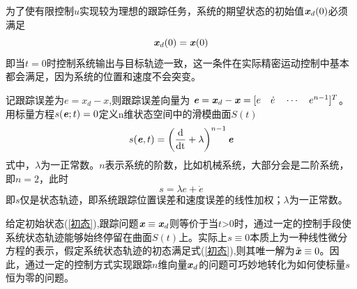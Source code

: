 为了使有限控制$u$实现较为理想的跟踪任务，系统的期望状态的初始值$\textbf{\textit{x}}_d(0)$必须满足
\begin{equation}
\label{初态}
\textbf{\textit{x}}_d(0)=\textbf{\textit{x}}(0)
\end{equation}
即当$t=0$时控制系统输出与目标轨迹一致，这一条件在实际精密运动控制中基本都会满足，因为系统的位置和速度不会突变。

记跟踪误差为$e=x_d-x$,则跟踪误差向量为 $\textbf{\textit{e}}=\textbf{\textit{x}}_d-\textbf{\textit{x}}=[e \quad\dot {e} \quad\cdots \quad e^{n-1}]^T$。用标量方程$s(\textbf{\textit{e}};t)=0$定义n维状态空间中的滑模曲面$S(t)$
\begin{equation}
\label{滑模面0}
s(\textbf{\textit{e}},t)=\left(\frac{\text{d}}{\text{dt}}+\lambda\right)^{n-1}\textbf{\textit{e}}
\end{equation}
式中，$\lambda$为一正常数。$n$表示系统的阶数，比如机械系统，大部分会是二阶系统，即$n=2$，此时
\begin{equation}
\label{滑模面1}
s=\lambda e+\dot{e}
\end{equation}
即$s$仅是状态轨迹，即系统跟踪位置误差和速度误差的线性加权；$\lambda$为一正常数。


给定初始状态(\ref{初态}),跟踪问题$\textbf{\textit{x}}\equiv\textbf{\textit{x}}_d$则等价于当$t$\textgreater$0$时，通过一定的控制手段使系统状态轨迹能够始终停留在曲面$S(t)$上。实际上$s\equiv0$本质上为一种线性微分方程的表示，假定系统状态轨迹的初态满足式(\ref{初态}),则其唯一解为$\tilde{\textbf{\textit{x}}}\equiv0$。因此，通过一定的控制方式实现跟踪$n$维向量$\textbf{\textit{x}}_d$的问题可巧妙地转化为如何使标量$s$恒为零的问题。

